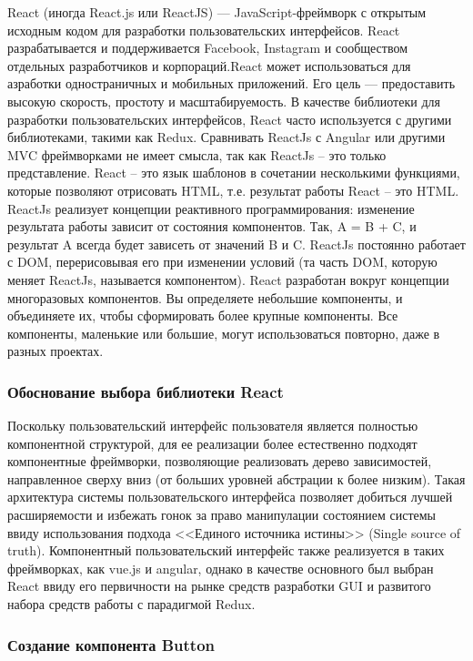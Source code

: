 React (иногда React.js или ReactJS)\cite{react} — JavaScript-фреймворк с открытым исходным кодом для разработки пользовательских интерфейсов.
React разрабатывается и поддерживается Facebook, Instagram и сообществом отдельных разработчиков и корпораций.React может использоваться для 
азработки одностраничных и мобильных приложений. Его цель — предоставить высокую скорость, простоту и масштабируемость. В качестве библиотеки для разработки 
пользовательских интерфейсов, React часто используется с другими библиотеками, такими как Redux.
Сравнивать ReactJs с Angular или другими MVC фреймворками не имеет смысла, так как ReactJs – это только представление. React – это язык шаблонов в сочетании 
несколькими функциями, которые позволяют отрисовать HTML, т.е. результат работы React – это HTML. ReactJs реализует концепции реактивного программирования: изменение 
результата работы зависит от состояния компонентов. Так, A = B + C, и результат A всегда будет зависеть от значений B и C. ReactJs постоянно работает с DOM, перерисовывая 
его при изменении условий (та часть DOM, которую меняет ReactJs, называется компонентом). 
React разработан вокруг концепции многоразовых компонентов. Вы определяете небольшие компоненты, и объединяете их, чтобы сформировать более крупные компоненты.
Все компоненты, маленькие или большие, могут использоваться повторно, даже в разных проектах.

\subsubsection{Обоснование выбора библиотеки React}
Поскольку пользовательский интерфейс пользователя является полностью компонентной структурой\cite{genesisgui}, для ее реализации более естественно подходят компонентные фреймворки, позволяющие
реализовать дерево зависимостей, направленное сверху вниз (от больших уровней абстрации к более низким). Такая архитектура системы пользовательского интерфейса позволяет добиться лучшей расширяемости
и избежать гонок за право манипулации состоянием системы ввиду использования подхода <<Единого источника истины>> (Single source of truth). Компонентный пользовательский интерфейс также реализуется
в таких фреймворках, как vue.js и angular, однако в качестве основного был выбран React ввиду его первичности на рынке средств разработки GUI и развитого набора средств работы с парадигмой Redux.

\subsubsection{Создание компонента Button}

